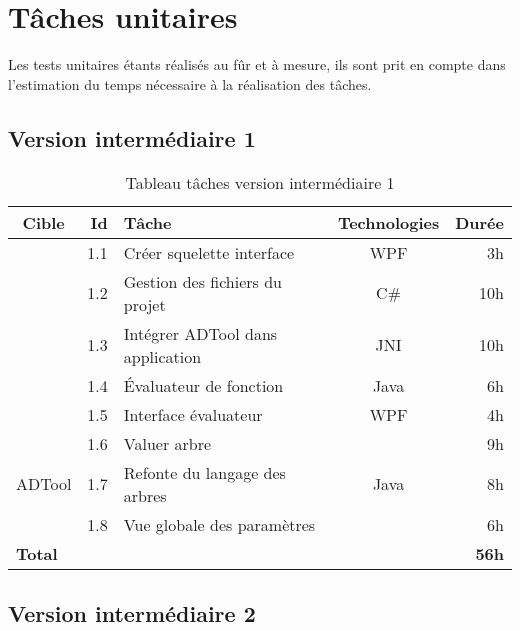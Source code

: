 \section{Tâches unitaires}
	\label{sec:taches_unitaires}

	Les tests unitaires étants réalisés au fûr et à mesure, ils sont prit en compte dans l'estimation du temps nécessaire à la réalisation des tâches.

	\subsection{Version intermédiaire 1}

		\begin{table}[h]
			\centering
			\begin{tabular}{|c|r|l|c|r|}
				\hline
				\textbf{Cible} & \textbf{Id} & \textbf{Tâche} & \textbf{Technologies} & \textbf{Durée}\\
				\hline

				\multirow{5}{*}{\glasir{}} & 1.1 & Créer squelette interface & WPF & 3h\\
				\cline{2-5}
				 & 1.2 & Gestion des fichiers du projet & C\# & 10h\\
				\cline{2-5}
				 & 1.3 & Intégrer ADTool dans application & JNI & 10h\\
				\cline{2-5}
				 & 1.4 & \'Evaluateur de fonction & Java & 6h\\
				\cline{2-5}
				 & 1.5 & Interface évaluateur & WPF & 4h\\
				\hline

				\multirow{3}{*}{ADTool} & 1.6 & Valuer arbre & \multirow{3}{*}{Java} & 9h\\
				\cline{2-3} \cline{5-5}
				 & 1.7 & Refonte du langage des arbres & & 8h\\
				\cline{2-3} \cline{5-5}
				 & 1.8 & Vue globale des paramètres & & 6h\\
				\hline

				\multicolumn{4}{|l|}{\bf Total} & {\bf 56h}\\
				\hline
			\end{tabular}
			\caption{Tableau tâches version intermédiaire 1}
			\label{fig:taches_units_1}
		\end{table}

	\subsection{Version intermédiaire 2}

